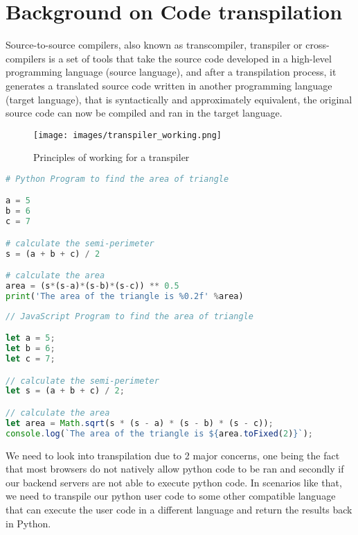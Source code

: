 \section{Background on Code transpilation}
Source-to-source compilers, also known as transcompiler, transpiler or cross-compilers is a set of tools that take the source code developed in a high-level programming language (source language), and after a transpilation process, it generates a translated source code written in another programming language (target language), that is syntactically and approximately equivalent, the original source code can now be compiled and ran in the target language. 

\begin{figure}[H]
    \centering
    \texttt{[image: images/transpiler\_working.png]}
    \caption{Principles of working for a transpiler}
    \label{fig:transpiler_working}
\end{figure}

\begin{lstlisting}[language=Python, caption=Example of python user code]
# Python Program to find the area of triangle

a = 5
b = 6
c = 7

# calculate the semi-perimeter
s = (a + b + c) / 2

# calculate the area
area = (s*(s-a)*(s-b)*(s-c)) ** 0.5
print('The area of the triangle is %0.2f' %area)

\end{lstlisting}

\begin{lstlisting}[language=JavaScript, caption=Example of a transpiled code]
// JavaScript Program to find the area of triangle

let a = 5;
let b = 6;
let c = 7;

// calculate the semi-perimeter
let s = (a + b + c) / 2;

// calculate the area
let area = Math.sqrt(s * (s - a) * (s - b) * (s - c));
console.log(`The area of the triangle is ${area.toFixed(2)}`);
\end{lstlisting}

We need to look into transpilation due to 2 major concerns, one being the fact that most browsers do not natively allow python code to be ran and secondly if our backend servers are not able to execute python code. In scenarios like that, we need to transpile our python user code to some other compatible language that can execute the user code in a different language and return the results back in Python.

